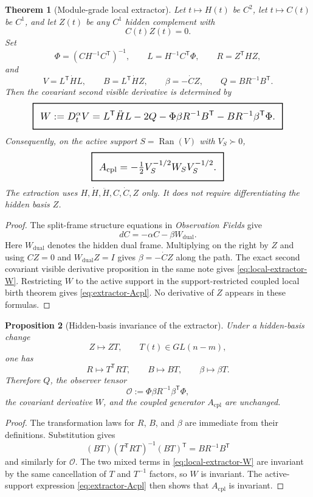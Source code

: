 \documentclass[11pt,a4paper]{article}
\numberwithin{equation}{section}
\DeclareMathOperator{\Ran}{Ran}
\newcommand{\geomboxed}[1]{%
  \setlength{\fboxsep}{8pt}%
  \setlength{\fboxrule}{0.9pt}%
  \fbox{\scalebox{1.18}{$\displaystyle #1$}}%
}
\theoremstyle{thmcompact}
\newtheorem{theorem}{Theorem}[section]
\newtheorem{proposition}[theorem]{Proposition}
\theoremstyle{remark}
\begin{document}
\begin{theorem}[Module-grade local extractor]
\label{thm:local-extractor}
Let $t\mapsto H(t)$ be $C^2$, let $t\mapsto C(t)$ be $C^1$, and let $Z(t)$ be any $C^1$ hidden complement with
\[
C(t)Z(t)=0.
\]
Set
\[
\Phi=(CH^{-1}C^{\mathsf T})^{-1},
\qquad
L=H^{-1}C^{\mathsf T}\Phi,
\qquad
R=Z^{\mathsf T}HZ,
\]
and
\[
V=L^{\mathsf T}\dot H L,
\qquad
B=L^{\mathsf T}\dot H Z,
\qquad
\beta=-\dot C Z,
\qquad
Q=BR^{-1}B^{\mathsf T}.
\]
Then the covariant second visible derivative is determined by
\begin{equation}
\geomboxed{
W:=D_t^\alpha V
=
L^{\mathsf T}\ddot H L
-2Q
-\Phi\beta R^{-1}B^{\mathsf T}
-BR^{-1}\beta^{\mathsf T}\Phi.
}
\label{eq:local-extractor-W}
\end{equation}
Consequently, on the active support $S=\Ran(V)$ with $V_S\succ0$,
\begin{equation}
\geomboxed{
A_{\mathrm{cpl}}
=-\tfrac12 V_S^{-1/2}W_SV_S^{-1/2}.
}
\label{eq:extractor-Acpl}
\end{equation}
The extraction uses $H,\dot H,\ddot H,C,\dot C,Z$ only. It does not require differentiating the hidden basis $Z$.
\end{theorem}

\begin{proof}
The split-frame structure equations in \emph{Observation Fields} give
\[
dC=-\alpha C-\beta W_{\mathrm{dual}}.
\]
Here $W_{\mathrm{dual}}$ denotes the hidden dual frame. Multiplying on the right by $Z$ and using $CZ=0$ and $W_{\mathrm{dual}}Z=I$ gives $\beta=-\dot C Z$ along the path. The exact second covariant visible derivative proposition in the same note gives \eqref{eq:local-extractor-W}. Restricting $W$ to the active support in the support-restricted coupled local birth theorem gives \eqref{eq:extractor-Acpl}. No derivative of $Z$ appears in these formulas.
\end{proof}

\begin{proposition}[Hidden-basis invariance of the extractor]
\label{prop:extractor-invariance}
Under a hidden-basis change
\[
Z\mapsto ZT,
\qquad
T(t)\in GL(n-m),
\]
one has
\[
R\mapsto T^{\mathsf T}RT,
\qquad
B\mapsto BT,
\qquad
\beta\mapsto \beta T.
\]
Therefore $Q$, the observer tensor
\[
\mathcal O:=\Phi\beta R^{-1}\beta^{\mathsf T}\Phi,
\]
the covariant derivative $W$, and the coupled generator $A_{\mathrm{cpl}}$ are unchanged.
\end{proposition}

\begin{proof}
The transformation laws for $R$, $B$, and $\beta$ are immediate from their definitions. Substitution gives
\[
(BT)(T^{\mathsf T}RT)^{-1}(BT)^{\mathsf T}=BR^{-1}B^{\mathsf T}
\]
and similarly for $\mathcal O$. The two mixed terms in \eqref{eq:local-extractor-W} are invariant by the same cancellation of $T$ and $T^{-1}$ factors, so $W$ is invariant. The active-support expression \eqref{eq:extractor-Acpl} then shows that $A_{\mathrm{cpl}}$ is invariant.
\end{proof}
\end{document}
